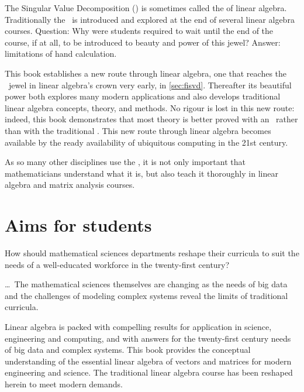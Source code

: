 The Singular Value Decomposition (\svd) is sometimes called the \emph{} of linear algebra.
Traditionally the \svd\ is introduced and explored at the end of several linear algebra courses.
Question: Why were students required to wait until the end of the course, if at all, to be introduced to beauty and power of this jewel?
Answer: limitations of hand calculation.

This book establishes a new route through linear algebra, one that reaches the \svd\ jewel in linear algebra's crown very early, in \autoref{sec:fisvd}.
Thereafter its beautiful power both explores many modern applications and also develops traditional linear algebra concepts, theory, and methods.
No rigour is lost in this new route: indeed, this book demonstrates that most theory is better proved with an \svd\ rather than with the traditional \rref.
This new route through linear algebra becomes available by the ready availability of ubiquitous computing in the 21st century.


\begin{quoted}{\cite[p.30]{Turner2014}}
As so many other disciplines use the \svd, it is not only important that mathematicians understand what it is, but also teach it thoroughly in linear algebra and matrix analysis courses.
\end{quoted}











\section*{Aims for students}

\begin{quoted}{\cite{Bressoud2014}}
How should mathematical sciences departments reshape their curricula to suit the needs of a well-educated workforce in the twenty-first century?

\ldots\
The mathematical sciences themselves are changing as the needs of big data and the challenges of modeling complex systems reveal the limits of traditional curricula.
%
\end{quoted}



Linear algebra is packed with compelling results for application in science, engineering and computing, and with answers for the twenty-first century needs of big data and complex systems.
This book provides the conceptual understanding of the essential linear algebra of vectors and matrices for modern engineering and science.
The traditional linear algebra course has been reshaped herein to meet modern demands.

